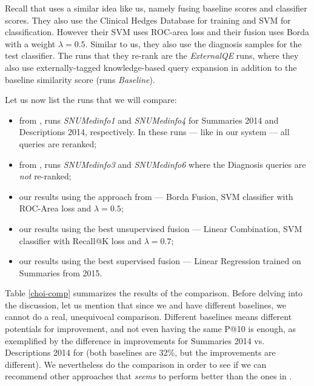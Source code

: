 Recall that \cite{choi} uses a similar idea like us, namely fusing baseline scores and
classifier scores. They also use the Clinical Hedges Database for training and SVM for classification.
However their SVM uses ROC-area loss and their fusion uses Borda with a weight $\lambda=0.5$.
Similar to us, they also use the diagnosis samples for the test classifier.
The runs that they re-rank are the \emph{ExternalQE} runs, where 
they also use externally-tagged knowledge-based query expansion in addition to the baseline similarity score
(runs \emph{Baseline}).

Let us now list the runs that we will compare:
\begin{itemize}
 \item from \cite{choi}, runs \emph{SNUMedinfo1} and \emph{SNUMedinfo4} for Summaries 2014 and Descriptions 2014, respectively.
  In these runs --- like in our system --- all queries are reranked;
 \item from \cite{choi}, runs \emph{SNUMedinfo3} and \emph{SNUMedinfo6} where the Diagnosis queries are \emph{not} re-ranked;
 \item our results using the approach from \cite{choi} --- Borda Fusion, SVM classifier with ROC-Area loss and $\lambda=0.5$;
 \item our results using the best unsupervised fusion --- Linear Combination, SVM classifier with Recall@K loss and $\lambda=0.7$;
 \item our results using the best supervised fusion --- Linear Regression trained on Summaries from 2015.
\end{itemize}

Table \ref{choi-comp} summarizes the results of the comparison.
Before delving into the discussion, let us mention that since we and \cite{choi} have different baselines, 
we cannot do a real, unequivocal comparison. Different baselines means different potentials for improvement, and
not even having the same P@10 is enough, as exemplified by the difference in improvements for Summaries
2014 vs. Descriptions 2014 for \cite{choi} (both baselines are 32\%, but the improvements are different).
We nevertheless do the comparison in order to see if we can recommend other approaches that \emph{seems}
to perform better than the ones in \cite{choi}.

